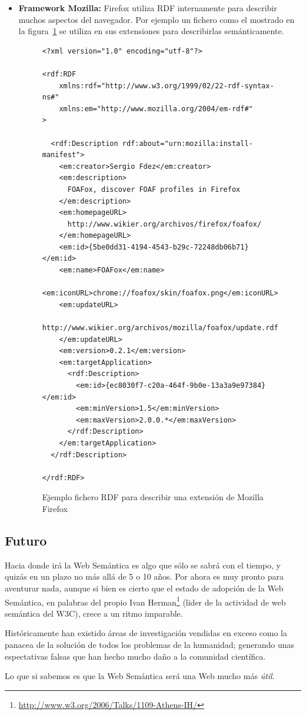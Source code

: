 \begin{itemize}
  \item \textbf{Framework Mozilla:} Firefox utiliza RDF internamente para 
	describir muchos aspectos del navegador. Por ejemplo un fichero como 
	el mostrado en la figura~\ref{fig:rdf.firefox} se utiliza en sus
	extensiones para describirlas semánticamente.

\begin{figure}[H]
\lstset{language=RDF}
\begin{lstlisting}
<?xml version="1.0" encoding="utf-8"?>

<rdf:RDF 
	xmlns:rdf="http://www.w3.org/1999/02/22-rdf-syntax-ns#"
	xmlns:em="http://www.mozilla.org/2004/em-rdf#"
>

  <rdf:Description rdf:about="urn:mozilla:install-manifest">
    <em:creator>Sergio Fdez</em:creator>
    <em:description>
      FOAFox, discover FOAF profiles in Firefox
    </em:description>
    <em:homepageURL>
      http://www.wikier.org/archivos/firefox/foafox/
    </em:homepageURL>
    <em:id>{5be0dd31-4194-4543-b29c-72248db06b71}</em:id>
    <em:name>FOAFox</em:name>
    <em:iconURL>chrome://foafox/skin/foafox.png</em:iconURL>
    <em:updateURL>
      http://www.wikier.org/archivos/mozilla/foafox/update.rdf
    </em:updateURL>
    <em:version>0.2.1</em:version>
    <em:targetApplication>
      <rdf:Description>
        <em:id>{ec8030f7-c20a-464f-9b0e-13a3a9e97384}</em:id>
        <em:minVersion>1.5</em:minVersion>
        <em:maxVersion>2.0.0.*</em:maxVersion>
      </rdf:Description>
    </em:targetApplication>
  </rdf:Description>

</rdf:RDF>
\end{lstlisting}
\caption{Ejemplo fichero RDF para describir una extensión de Mozilla Firefox}
\label{fig:rdf.firefox}
\end{figure}

\end{itemize}


\subsection{Futuro}

Hacia donde irá la Web Semántica es algo que sólo se sabrá con el tiempo, y quizás
en un plazo no más allá de 5 o 10 años. Por ahora es muy pronto para aventurar nada,
aunque si bien es cierto que el estado de adopción de la Web Semántica, en palabras
del propio Ivan Herman\footnote{\url{http://www.w3.org/2006/Talks/1109-Athens-IH/}}
(lider de la actividad de web semántica del W3C), crece a un ritmo imparable.

Históricamente han existido áreas de investigación vendidas en exceso como la 
panacea de la solución de todos los problemas de la humanidad; generando unas 
espectativas falsas que han hecho mucho daño a la comunidad científica.

Lo que si sabemos es que la Web Semántica será una Web mucho más \emph{útil}.
